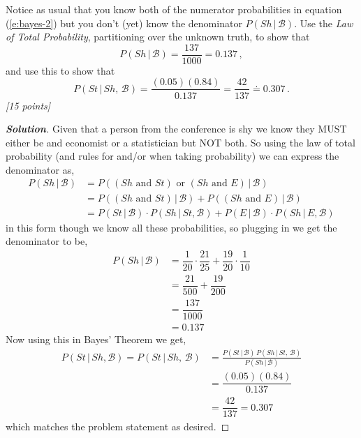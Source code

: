 \documentclass[12pt]{article}
\newcommand{\given}{\, | \,}
\newenvironment{solution}{\begin{proof}[\textbf{\textit{Solution}}] }{\end{proof}}
\begin{document}
\begin{itemize}
Notice as usual that you know both of the numerator probabilities in equation (\ref{e:bayes-2}) but you don't (yet) know the denominator $P ( Sh \given \mathcal{ B } )$. Use the \textit{Law of Total Probability}, partitioning over the unknown truth, to show that
\begin{equation} \label{e:bayes-2}
P ( Sh \given \mathcal{ B } ) = \frac{ 137 }{ 1000 } = 0.137 \, ,
\end{equation}
and use this to show that
\begin{equation} \label{e:bayes-3}
P ( St \given Sh, \, \mathcal{ B } ) = \frac{ ( 0.05 ) ( 0.84 ) }{ 0.137 } = \frac{ 42 }{ 137 } \doteq 0.307 \, .
\end{equation}
\textit{[15 points]}
\begin{solution}
    Given that a person from the conference is shy we know they MUST either be and economist or a statistician but NOT both. So using the law of total probability (and rules for and/or when taking probability) we can express the denominator as,
    \begin{align*}
        P(Sh \given \mathcal{B}) &= P((Sh \text{ and }St) \text{ or } (Sh\text{ and }E) \given \mathcal{B}) \\
        &= P((Sh\text{ and }St) \given \mathcal{B}) + P((Sh\text{ and } E) \given \mathcal{B}) \\
        &= P(St \given \mathcal{B}) \cdot P(Sh \given St, \mathcal{B}) + P(E \given \mathcal{B}) \cdot P(Sh \given E, \mathcal{B})
    \end{align*}
    in this form though we know all these probabilities, so plugging in we get the denominator to be,
    \begin{align*}
        P(Sh \given \mathcal{B}) &= \dfrac{1}{20} \cdot \dfrac{21}{25} +  \dfrac{19}{20} \cdot \dfrac{1}{10} \\
        &= \dfrac{21}{500} + \dfrac{19}{200} \\
        &= \dfrac{137}{1000} \\
        &= 0.137
    \end{align*}
    Now using this in Bayes' Theorem we get,
    \begin{align*}
        P(St \given Sh, \mathcal{B}) = P ( St \given Sh, \, \mathcal{ B } ) &= \frac{ P ( St \given \mathcal{ B } ) \, P ( Sh \given St, \, \mathcal{ B } ) }{ P ( Sh \given \mathcal{ B } ) } \\
        &= \dfrac{(0.05)(0.84)}{0.137} \\
        &= \dfrac{42}{137} = 0.307
    \end{align*}
    which matches the problem statement as desired. 
\end{solution}


\end{itemize}
\end{document}
